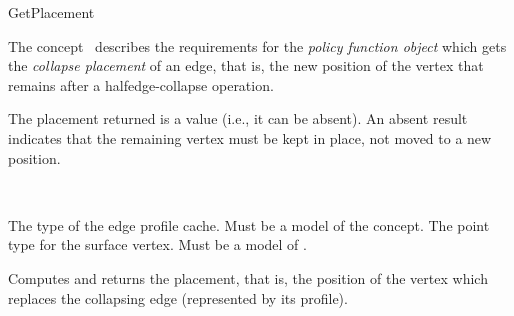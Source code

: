 
\begin{ccRefFunctionObjectConcept}{GetPlacement}


\ccDefinition

The concept \ccRefName\ describes the requirements for the {\em policy
function object} which gets the {\em collapse placement} of an edge,
that is, the new position of the vertex that remains after a 
halfedge-collapse operation.

The placement returned is a  value (i.e., it can
be absent). An absent result indicates that the remaining vertex 
must be kept in place, not moved to a new position.

\ccRefines
{}\\

\ccTypes
  {The type of the edge profile cache. Must be a model of the  concept.}{}
\ccGlue    
  {The point type for the surface vertex.  Must be a model of .}
\ccGlue    


\ccOperations

\ccTagFullDeclarations
  {Computes and returns the placement, that is, the position of the vertex 
  which replaces the collapsing edge (represented by its profile).}
  
\ccHasModels
{}\\

\end{ccRefFunctionObjectConcept}

